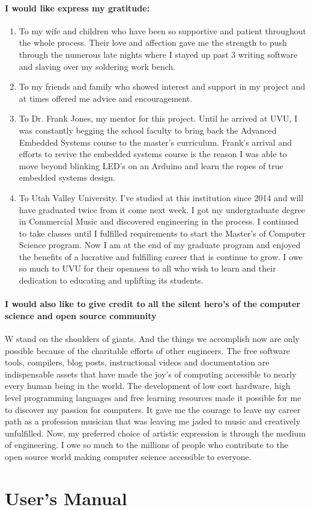 \documentclass[acmlarge,screen]{acmart}
\begin{document}
	\paragraph{I would like express my gratitude:}
	\begin{enumerate}
		\item To my wife and children who have been so supportive and patient throughout the whole process. Their love and affection gave me the strength to push through the numerous late nights where I stayed up past 3 writing software and slaving over my soldering work bench.
		\item To my friends and family who showed interest and support in my project and at times offered me advice and encouragement.
		\item To Dr. Frank Jones, my mentor for this project. Until he arrived at UVU, I was constantly begging the school faculty to bring back the Advanced Embedded Systems course to the master's curriculum. Frank's arrival and efforts to revive the embedded systems course is the reason I was able to move beyond blinking LED's on an Arduino and learn the ropes of true embedded systems design.
		\item To Utah Valley University. I've studied at this institution since 2014 and will have graduated twice from it come next week. I got my undergraduate degree in Commercial Music and discovered engineering in the process. I continued to take classes until I fulfilled requirements to start the Master's of Computer Science program. Now I am at the end of my graduate program and enjoyed the benefits of a lucrative and fulfilling career that is continue to grow. I owe so much to UVU for their openness to all who wish to learn and their dedication to educating and uplifting its students.
	\end{enumerate}

	\paragraph{I would also like to give credit to all the silent hero's of the computer science and open source community} W stand on the shoulders of giants. And the things we accomplish now are only possible because of the charitable efforts of other engineers. The free software tools, compilers, blog posts, instructional videos and documentation are indispensable assets that have made the joy's of computing accessible to nearly every human being in the world. The development of low cost hardware, high level programming languages and free learning resources made it possible for me to discover my passion for computers. It gave me the courage to leave my career path as a profession musician that was leaving me jaded to music and creatively unfulfilled. Now, my preferred choice of artistic expression is through the medium of engineering. I owe so much to the millions of people who contribute to the open source world making computer science accessible to everyone.




\appendix

\section{User's Manual}
\end{document}
